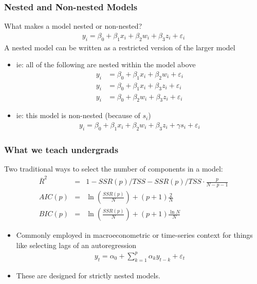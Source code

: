 \documentclass[xcolor=pdftex,dvipsnames,table,mathserif,aspectratio=169]{beamer}
\begin{document}
\begin{frame}
\frametitle{Nested and Non-nested Models}
What makes a model \alert{nested} or \alert{non-nested}?
\begin{align*}
y_i = \beta_0 + \beta_1 x_i + \beta_2 w_i + \beta_3 z_i + \varepsilon_i 
\end{align*}
A nested model can be written as a restricted version of the larger model
\begin{itemize}
\item ie: all of the following are nested within the model above
\begin{align*}
y_i &= \beta_0 + \beta_1 x_i + \beta_2 w_i + \varepsilon_i  \\
y_i &= \beta_0 + \beta_1 x_i + \beta_3 z_i + \varepsilon_i  \\
y_i &= \beta_0 + \beta_2 w_i + \beta_3 z_i + \varepsilon_i  
\end{align*}
\item ie: this model is non-nested (because of $s_i$)
\begin{align*}
y_i = \beta_0 + \beta_1 x_i + \beta_2 w_i + \beta_3 z_i + \gamma s_i +  \varepsilon_i 
\end{align*}
\end{itemize}
\end{frame}


\begin{frame}
\frametitle{What we teach undergrads}
\small
Two traditional ways to select the number of components in a model:\\
\begin{eqnarray*}
\overline{R}^2  &=& 1-SSR(p)/TSS - SSR(p)/TSS \cdot \frac{p}{N-p-1} \\
AIC(p) &=& \ln\left(\frac{SSR(p)}{N}\right) + (p+1)\frac{2}{N}\\
BIC(p) &=& \ln \left(\frac{SSR(p)}{N} \right) + (p+1)\frac{\ln N}{N}
\end{eqnarray*}
\begin{itemize}
\item Commonly employed in macroeconometric or time-series context for things like selecting lags of an autoregression
\begin{eqnarray*}
y_t = \alpha_0 + \sum_{k=1}^p \alpha_k y_{t-k} + \varepsilon_t
\end{eqnarray*}
\item These are designed for strictly \alert{nested} models.
\end{itemize}
\end{frame}
\end{document}
